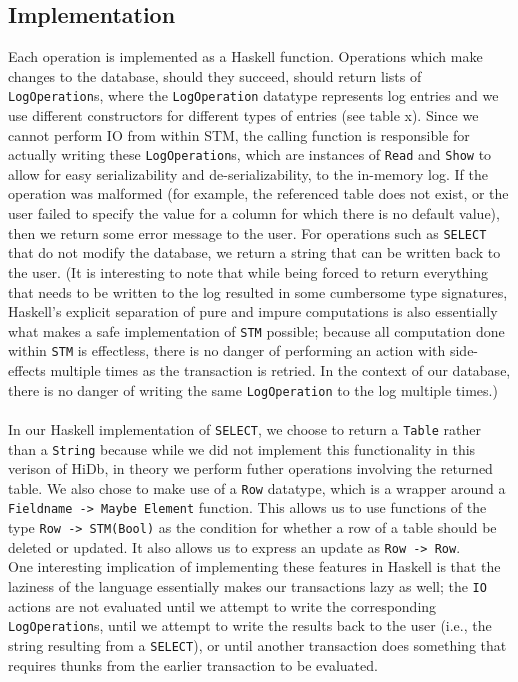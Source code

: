 \documentclass[10pt]{article}
\begin{document}
\begin{multicols}{2}
\subsection{Implementation}
Each operation is implemented as a Haskell function.  Operations which make changes to the database, should they succeed, should return lists of \texttt{LogOperation}s, where the \texttt{LogOperation} datatype represents log entries and we use different constructors for different types of entries (see table x). Since we cannot perform IO from within STM, the calling function is responsible for actually writing these \texttt{LogOperation}s, which are instances of \texttt{Read} and \texttt{Show} to allow for easy serializability and de-serializability, to the in-memory log. If the operation was malformed (for example, the referenced table does not exist, or the user failed to specify the value for a column for which there is no default value), then we return some error message to the user. For operations such as \texttt{SELECT} that do not modify the database, we return a string that can be written back to the user. (It is interesting to note that while being forced to return everything that needs to be written to the log resulted in some cumbersome type signatures, 
Haskell's explicit separation of pure and impure computations is also essentially what makes a safe implementation of \texttt{STM} possible; because all computation done within \texttt{STM} is effectless, there is no danger of performing an action with side-effects multiple times as the transaction is retried. In the context of our database, there is no danger of writing the same \texttt{LogOperation} to the log multiple times.) \\\\
In our Haskell implementation of \texttt{SELECT}, we choose to return a \texttt{Table} rather than a \texttt{String} because while we did not implement this functionality in this verison of HiDb, in theory we perform futher operations involving the returned table. We also chose to make use of a \texttt{Row} datatype, which is a wrapper around a \texttt{Fieldname -> Maybe Element} function. This allows us to use functions of the type \texttt{Row -> STM(Bool)} as the condition for whether a row of a table should be deleted or updated. It also allows us to express an update as \texttt{Row -> Row}. \\
One interesting implication of implementing these features in Haskell is that the laziness of the language essentially makes our transactions lazy as well; the \texttt{IO} actions are not evaluated until we attempt to write the corresponding \texttt{LogOperation}s, until we attempt to write the results back to the user (i.e., the string resulting from a \texttt{SELECT}), or until another transaction does something that requires thunks from the earlier transaction to be evaluated.

\end{multicols}
\end{document}
